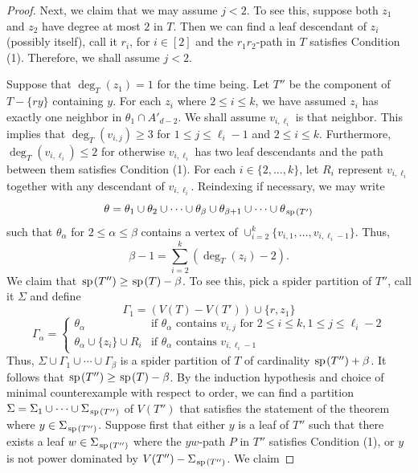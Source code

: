 \documentclass[11pt]{article}
\newcommand{\spider}{\hskip1pt \textrm{sp} \hskip1pt}
\begin{document}
\begin{proof}
Next, we claim that we may assume $j < 2$. To see this, suppose both $z_1$ and $z_2$ have degree at most $2$ in $T$. Then we can find a leaf descendant of $z_i$ (possibly itself), call it $r_i$, for $i \in [2]$ and the $r_1r_2$-path in $T$ satisfies Condition (1). Therefore, we shall assume $j < 2$.

Suppose that $\deg_T(z_1) =1$ for the time being. Let $T''$ be the component of $T- \{ry\}$ containing $y$. For each $z_i$ where $2 \le i \le k$, we have assumed $z_i$ has exactly one neighbor in $\theta_1 \cap A'_{d-2}$. We shall assume $v_{i, \ell_i}$ is that neighbor. This implies that $\deg_T(v_{i,j}) \ge 3$ for $1 \le j \le \ell_i -1$ and $2 \le i \le k$. Furthermore, $\deg_T(v_{i, \ell_i}) \le 2$ for otherwise $v_{i, \ell_i}$ has two leaf descendants and the path between them satisfies Condition (1). For each $i \in \{2, \dots, k\}$, let $R_i$ represent $v_{i, \ell_i}$ together with any descendant of $v_{i, \ell_i}$. Reindexing if necessary, we may write 
\[\theta = \theta_1 \cup \theta_2 \cup \cdots \cup \theta_{\beta} \cup \theta_{\beta+1} \cup \cdots \cup \theta_{\spider(T')}\]
such that $\theta_{\alpha}$ for $2 \le \alpha \le \beta$ contains a vertex of $\cup_{i=2}^k \{v_{i,1}, \dots, v_{i,\ell_i-1}\}$. Thus, 
\[\beta-1 = \sum_{i=2}^k (\deg_T(z_i) - 2).\]
We claim that $\spider(T'') \ge \spider(T) - \beta$. To see this, pick a spider partition of $T''$, call it $\Sigma$ and define 
\[\Gamma_1 = (V(T) - V(T')) \cup \{r, z_1\}\]
\[\Gamma_{\alpha} = \begin{cases} 
\theta_{\alpha} & \text{if $\theta_{\alpha}$ contains $v_{i,j}$ for $2 \le i \le k, 1\le j \le \ell_i-2$}\\
\theta_{\alpha} \cup \{z_i\} \cup R_{i} & \text{if $\theta_{\alpha}$ contains $v_{i, \ell_i-1}$}
\end{cases}\]
Thus, $\Sigma \cup \Gamma_1 \cup \cdots \cup\Gamma_{\beta}$ is a spider partition of $T$ of cardinality $\spider(T'') + \beta$. It follows that $\spider(T'') \ge \spider(T) - \beta$. By the induction hypothesis and choice of minimal counterexample with respect to order,  we can find a partition $\Sigma = \Sigma_1 \cup \cdots \cup \Sigma_{\spider(T'')}$ of $V(T'')$ that satisfies the statement of the theorem where $y \in \Sigma_{\spider(T'')}$. Suppose first that either $y$ is a leaf of $T''$ such that there exists a leaf $w \in \Sigma_{\spider(T'')}$ where the $yw$-path $P$ in $T''$ satisfies Condition (1), or $y$ is not power dominated by $V(T'') - \Sigma_{\spider(T'')}$. We claim 

\end{proof}
\end{document}
